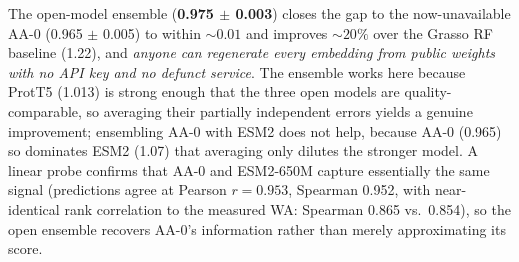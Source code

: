 \documentclass[12pt]{article}
\begin{document}
\begin{table}[H]
\centering
\caption{Open-weight ensemble result (vector NN, 5-seed ensembles). The ProtT5 + ESM2-650M + ProtBERT ensemble is fully reproducible from public HuggingFace weights and recovers all but ${\sim}0.01$ of the now-unavailable Ginkgo AA-0 performance, improving ${\sim}20\%$ over the Grasso baseline. Standard deviations are reported where retrains were replicated.}
\label{tab:open_ensemble}
\end{table}

The open-model ensemble (\textbf{0.975 $\pm$ 0.003}) closes the gap to the now-unavailable AA-0 (0.965 $\pm$ 0.005) to within ${\sim}0.01$ and improves ${\sim}20\%$ over the Grasso RF baseline (1.22), and \emph{anyone can regenerate every embedding from public weights with no API key and no defunct service}.
The ensemble works here because ProtT5 (1.013) is strong enough that the three open models are quality-comparable, so averaging their partially independent errors yields a genuine improvement; ensembling AA-0 with ESM2 does not help, because AA-0 (0.965) so dominates ESM2 (1.07) that averaging only dilutes the stronger model.
A linear probe confirms that AA-0 and ESM2-650M capture essentially the same signal (predictions agree at Pearson $r = 0.953$, Spearman 0.952, with near-identical rank correlation to the measured WA: Spearman 0.865 vs.\ 0.854), so the open ensemble recovers AA-0's information rather than merely approximating its score.
\end{document}
